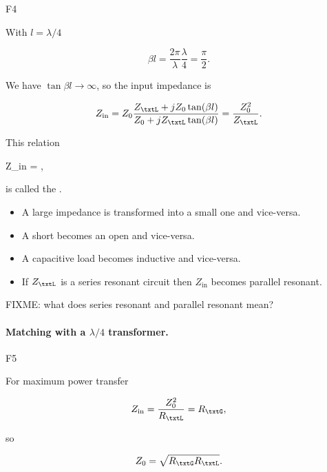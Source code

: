 F4

With \( l = \lambda/4 \)

\begin{dmath}\label{eqn:uwavesDeck5SmithChartCore:220}
\beta l 
= \frac{2 \pi}{\lambda} \frac{\lambda}{4}
= \frac{\pi}{2}.
\end{dmath}

We have \( \tan \beta l \rightarrow \infty \), so the input impedance is

\begin{dmath}\label{eqn:uwavesDeck5SmithChartCore:240}
Z_{\textrm{in}} 
= Z_0 \frac{ Z_\txtL + j Z_0 \tan(\beta l) }{ Z_0 + j Z_\txtL \tan(\beta l)}
= \frac{Z_0^2}{Z_\txtL}.
\end{dmath}

This relation

{
Z_{\textrm{in}} 
= ,
}

is called the .

\begin{itemize}
\item A large impedance is transformed into a small one and vice-versa.
\item A short becomes an open and vice-versa.
\item A capacitive load becomes inductive and vice-versa.
\item If \( Z_\txtL \) is a series resonant circuit then \( Z_{\textrm{in}} \) becomes parallel resonant.
\end{itemize}

FIXME: what does series resonant and parallel resonant mean?

\paragraph{Matching with a \( \lambda/4 \) transformer.}

F5

For maximum power transfer

\begin{equation}\label{eqn:uwavesDeck5SmithChartCore:300}
Z_{\textrm{in}} = \frac{Z_0^2}{R_\txtL} = R_\txtG, 
\end{equation}

so

\begin{equation}\label{eqn:uwavesDeck5SmithChartCore:320}
Z_0 = \sqrt{ R_\txtG R_\txtL }.
\end{equation}

